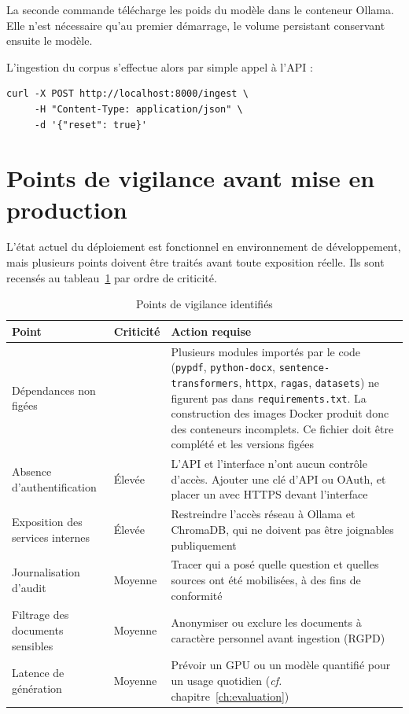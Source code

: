 La seconde commande télécharge les poids du modèle dans le conteneur Ollama. Elle
n'est nécessaire qu'au premier démarrage, le volume persistant conservant
ensuite le modèle.

L'ingestion du corpus s'effectue alors par simple appel à l'API :

\begin{lstlisting}[style=bash,caption={Ingestion via l'API}]
curl -X POST http://localhost:8000/ingest \
     -H "Content-Type: application/json" \
     -d '{"reset": true}'
\end{lstlisting}

\section{Points de vigilance avant mise en production}

L'état actuel du déploiement est fonctionnel en environnement de développement,
mais plusieurs points doivent être traités avant toute exposition réelle. Ils
sont recensés au tableau~\ref{tab:vigilance} par ordre de criticité.

\begin{table}[htbp]
\centering
\caption{Points de vigilance identifiés}
\label{tab:vigilance}
\small
\begin{tabularx}{\textwidth}{@{}p{4.1cm}p{2.1cm}X@{}}
\toprule
\textbf{Point} & \textbf{Criticité} & \textbf{Action requise} \\
\midrule
Dépendances non figées &
\aremplir{Bloquant} &
Plusieurs modules importés par le code (\texttt{pypdf}, \texttt{python-docx},
\texttt{sentence-transformers}, \texttt{httpx}, \texttt{ragas},
\texttt{datasets}) ne figurent pas dans \texttt{requirements.txt}. La
construction des images Docker produit donc des conteneurs incomplets. Ce
fichier doit être complété et les versions figées \\
\addlinespace
Absence d'authentification & Élevée &
L'API et l'interface n'ont aucun contrôle d'accès. Ajouter une clé d'API ou
OAuth, et placer un \eng{reverse proxy} avec HTTPS devant l'interface \\
\addlinespace
Exposition des services internes & Élevée &
Restreindre l'accès réseau à Ollama et ChromaDB, qui ne doivent pas être
joignables publiquement \\
\addlinespace
Journalisation d'audit & Moyenne &
Tracer qui a posé quelle question et quelles sources ont été mobilisées, à des
fins de conformité \\
\addlinespace
Filtrage des documents sensibles & Moyenne &
Anonymiser ou exclure les documents à caractère personnel avant ingestion
(RGPD) \\
\addlinespace
Latence de génération & Moyenne &
Prévoir un GPU ou un modèle quantifié pour un usage quotidien
(\emph{cf.} chapitre~\ref{ch:evaluation}) \\
\bottomrule
\end{tabularx}
\end{table}

